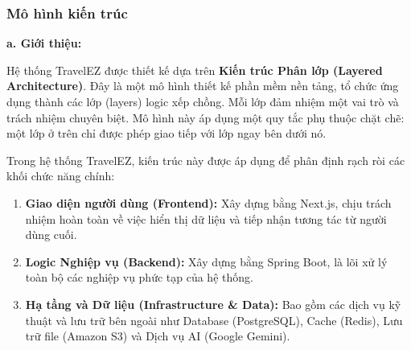 \subsubsection{Mô hình kiến trúc}

\noindent\textbf{a. Giới thiệu:}\par
Hệ thống TravelEZ được thiết kế dựa trên \textbf{Kiến trúc Phân lớp (Layered Architecture)}.
Đây là một mô hình thiết kế phần mềm nền tảng, tổ chức ứng dụng thành các lớp (layers) logic xếp chồng.
Mỗi lớp đảm nhiệm một vai trò và trách nhiệm chuyên biệt. Mô hình này áp dụng một quy tắc phụ thuộc chặt chẽ:
một lớp ở trên chỉ được phép giao tiếp với lớp ngay bên dưới nó.

Trong hệ thống TravelEZ, kiến trúc này được áp dụng để phân định rạch ròi các khối chức năng chính:
\begin{enumerate}
    \item \textbf{Giao diện người dùng (Frontend):} Xây dựng bằng Next.js, chịu trách nhiệm hoàn toàn về việc hiển thị dữ liệu và tiếp nhận tương tác từ người dùng cuối.
    \item \textbf{Logic Nghiệp vụ (Backend):} Xây dựng bằng Spring Boot, là lõi xử lý toàn bộ các nghiệp vụ phức tạp của hệ thống.
    \item \textbf{Hạ tầng và Dữ liệu (Infrastructure \& Data):} Bao gồm các dịch vụ kỹ thuật và lưu trữ bên ngoài như Database (PostgreSQL), Cache (Redis), Lưu trữ file (Amazon S3) và Dịch vụ AI (Google Gemini).
\end{enumerate}

